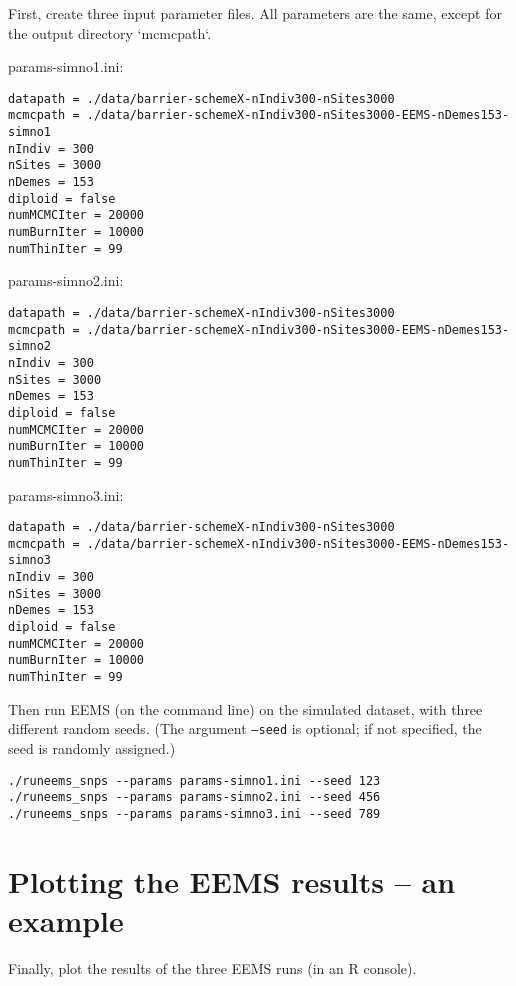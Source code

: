 \documentclass[a4paper,10pt,DIV=15,mpinclude=true]{scrartcl}
\begin{document}
First, create three input parameter files. All parameters are the same, except for the output directory `mcmcpath`.

\bigskip

\noindent params-simno1.ini:
\begin{verbatim}
datapath = ./data/barrier-schemeX-nIndiv300-nSites3000
mcmcpath = ./data/barrier-schemeX-nIndiv300-nSites3000-EEMS-nDemes153-simno1
nIndiv = 300
nSites = 3000
nDemes = 153
diploid = false
numMCMCIter = 20000
numBurnIter = 10000
numThinIter = 99
\end{verbatim}

\noindent params-simno2.ini:
\begin{verbatim}
datapath = ./data/barrier-schemeX-nIndiv300-nSites3000
mcmcpath = ./data/barrier-schemeX-nIndiv300-nSites3000-EEMS-nDemes153-simno2
nIndiv = 300
nSites = 3000
nDemes = 153
diploid = false
numMCMCIter = 20000
numBurnIter = 10000
numThinIter = 99
\end{verbatim}

\noindent params-simno3.ini:
\begin{verbatim}
datapath = ./data/barrier-schemeX-nIndiv300-nSites3000
mcmcpath = ./data/barrier-schemeX-nIndiv300-nSites3000-EEMS-nDemes153-simno3
nIndiv = 300
nSites = 3000
nDemes = 153
diploid = false
numMCMCIter = 20000
numBurnIter = 10000
numThinIter = 99
\end{verbatim}

Then run EEMS (on the command line) on the simulated dataset, with three different random seeds. (The argument {\tt --seed} is optional; if not specified, the seed is randomly assigned.)

\begin{verbatim}
./runeems_snps --params params-simno1.ini --seed 123
./runeems_snps --params params-simno2.ini --seed 456
./runeems_snps --params params-simno3.ini --seed 789
\end{verbatim}

\section{Plotting the EEMS results -- an example}\label{sec:plotting-eems}

Finally, plot the results of the three EEMS runs (in an R console).
\end{document}
